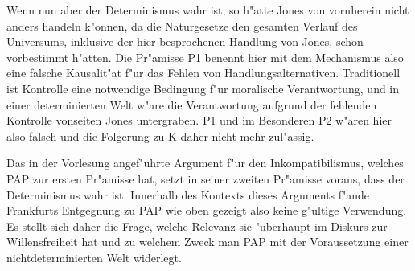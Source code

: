 \documentclass[a4paper]{article}
\begin{document}
Wenn nun aber der Determinismus wahr ist, so h"atte Jones von vornherein nicht anders handeln k"onnen, da die Naturgesetze den gesamten Verlauf des Universums, inklusive der hier besprochenen Handlung von Jones, schon vorbestimmt h"atten. Die Pr"amisse P1 benennt hier mit dem Mechanismus also eine falsche Kausalit"at f"ur das Fehlen von Handlungsalternativen. Traditionell ist Kontrolle eine notwendige Bedingung f"ur moralische Verantwortung, und in einer determinierten Welt w"are die Verantwortung aufgrund der fehlenden Kontrolle vonseiten Jones untergraben. P1 und im Besonderen P2 w"aren hier also falsch und die Folgerung zu K daher nicht mehr zul"assig.

Das in der Vorlesung angef"uhrte Argument f"ur den Inkompatibilismus, welches PAP zur ersten Pr"amisse hat, setzt in seiner zweiten Pr"amisse voraus, dass der Determinismus wahr ist. Innerhalb des Kontexts dieses Arguments f"ande Frankfurts Entgegnung zu PAP wie oben gezeigt also keine g"ultige Verwendung. Es stellt sich daher die Frage, welche Relevanz sie "uberhaupt im Diskurs zur Willensfreiheit hat und zu welchem Zweck man PAP mit der Voraussetzung einer nichtdeterminierten Welt widerlegt.
\end{document}
